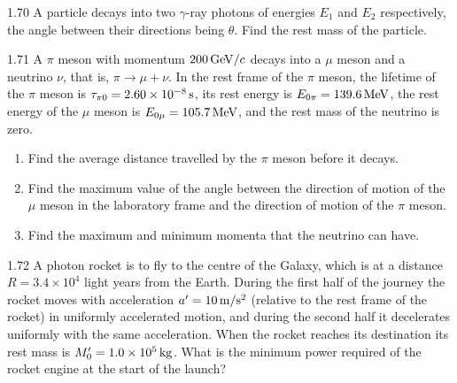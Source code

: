 \begin{problem}{1.70}
A particle decays into two $\gamma$-ray photons of energies $E_1$ and $E_2$ respectively, the angle between their directions being $\theta$. Find the rest mass of the particle.
\end{problem}

\begin{problem}{1.71}
A $\pi$ meson with momentum $200\,\mathrm{GeV}/c$ decays into a $\mu$ meson and a neutrino $\nu$, that is, $\pi\to\mu+\nu$. In the rest frame of the $\pi$ meson, the lifetime of the $\pi$ meson is $\tau_{\pi 0}=2.60\times10^{-8}\,\mathrm{s}$, its rest energy is $E_{0\pi}=139.6\,\mathrm{MeV}$, the rest energy of the $\mu$ meson is $E_{0\mu}=105.7\,\mathrm{MeV}$, and the rest mass of the neutrino is zero.
\begin{enumerate}[label=(\arabic*),leftmargin=2.2em,itemsep=1pt,topsep=2pt]
\item Find the average distance travelled by the $\pi$ meson before it decays.
\item Find the maximum value of the angle between the direction of motion of the $\mu$ meson in the laboratory frame and the direction of motion of the $\pi$ meson.
\item Find the maximum and minimum momenta that the neutrino can have.
\end{enumerate}
\end{problem}

\begin{problem}{1.72}
A photon rocket is to fly to the centre of the Galaxy, which is at a distance $R=3.4\times10^4$ light years from the Earth. During the first half of the journey the rocket moves with acceleration $a'=10\,\mathrm{m/s^2}$ (relative to the rest frame of the rocket) in uniformly accelerated motion, and during the second half it decelerates uniformly with the same acceleration. When the rocket reaches its destination its rest mass is $M_0'=1.0\times10^5\,\mathrm{kg}$. What is the minimum power required of the rocket engine at the start of the launch?
\end{problem}
